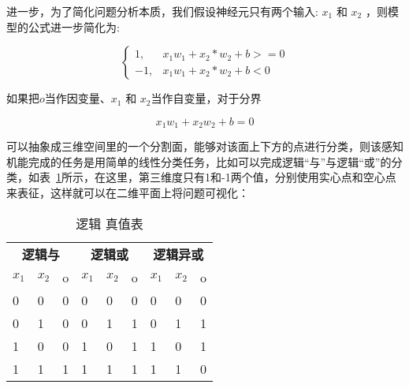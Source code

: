 进一步，为了简化问题分析本质，我们假设神经元只有两个输入: $x_1$ 和 $x_2$ ，则模型的公式进一步简化为:

\begin{equation}
    \begin{cases} 
        1, & x_1w_1+x_2 * w_2+b>=0 \\
        -1, & x_1w_1+x_2*w_2+b<0 
    \end{cases}
\end{equation}

如果把$o$当作因变量、$x_1$ 和 $x_2$当作自变量，对于分界

\begin{equation}
    x_1w_1+x_2w_2+b=0
\end{equation}

可以抽象成三维空间里的一个分割面，能够对该面上下方的点进行分类，则该感知机能完成的任务是用简单的线性分类任务，比如可以完成逻辑“与”与逻辑“或”的分类，如表~\ref{tab:logic}所示，在这里，第三维度只有1和-1两个值，分别使用实心点和空心点来表征，这样就可以在二维平面上将问题可视化：

\begin{table}[!htbp]
    \caption{逻辑 真值表}
    \label{tab:logic}
    \centering
    \footnotesize%
    \setlength{\tabcolsep}{4pt}%
    \renewcommand{\arraystretch}{1.2}%
    \begin{tabular}{lllllllll}
    \toprule
    \multicolumn{3}{c}{\textbf{逻辑与}}  & \multicolumn{3}{c}{\textbf{逻辑或}} & \multicolumn{3}{c}{\textbf{逻辑异或}}       \\
    $x_1$ & $x_2$ & o & $x_1$ & $x_2$ & o & $x_1$ & $x_2$ & o   \\
    \midrule
    0              & 0              & 0              & 0              & 0              & 0              & 0              & 0              & 0              \\
    0              & 1              & 0              & 0              & 1              & 1              & 0              & 1              & 1              \\
    1              & 0              & 0              & 1              & 0              & 1              & 1              & 0              & 1              \\
    1              & 1              & 1              & 1              & 1              & 1              & 1              & 1              & 0              \\
    \bottomrule
    \end{tabular}
    \end{table}

